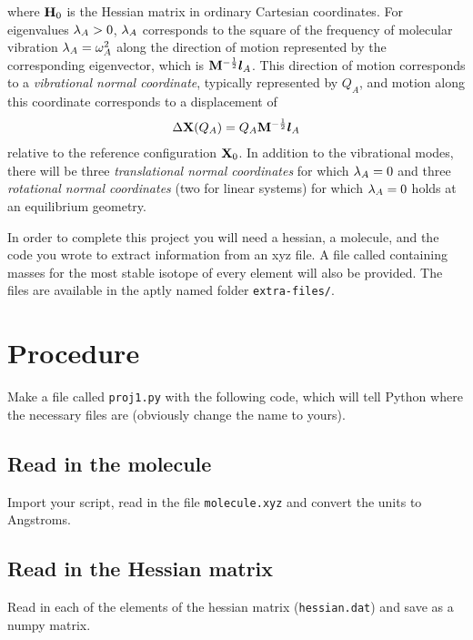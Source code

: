 \documentclass[11pt]{article}
\begin{document}
where $\mathbf{H}_0$ is the Hessian matrix in ordinary Cartesian coordinates. For
eigenvalues $\lambda_A > 0$, $\lambda_A$ corresponds to the square of the frequency of
molecular vibration $\lambda_A = \omega_A^2$ along the direction of motion represented
by the corresponding eigenvector, which is $\mathbf{M}^{-\frac{1}{2}} \bm{l}_A$.
This direction of motion corresponds to a {\it vibrational normal coordinate},
typically represented by $Q_A$, and motion along this coordinate corresponds to
a displacement of
\begin{align}
    \Delta\mathbf{X}(Q_A) = Q_A\mathbf{M}^{-\frac{1}{2}}\bm{l}_A
\end{align}
relative to the reference configuration $\mathbf{X}_0$. In addition to the
vibrational modes, there will be three {\it translational normal coordinates}
for which $\lambda_A=0$ and three {\it rotational normal coordinates} (two for
linear systems) for which $\lambda_A=0$ holds at an equilibrium geometry.

In order to complete this project you will need a hessian, a molecule, and the
code you wrote to extract information from an xyz file. A file called
 containing masses for the most stable isotope of every
element will also be provided. The files are available in the aptly named
folder \texttt{extra-files/}.

\newpage
\section{Procedure}

Make a file called \texttt{proj1.py} with the following code, which will tell
Python where the necessary files are (obviously change the name to yours).


\subsection{Read in the molecule}
Import your script, read in the file \texttt{molecule.xyz} and convert the units
to Angstroms.

\subsection{Read in the Hessian matrix}
Read in each of the elements of the hessian matrix (\texttt{hessian.dat}) and
save as a numpy matrix.
\end{document}
